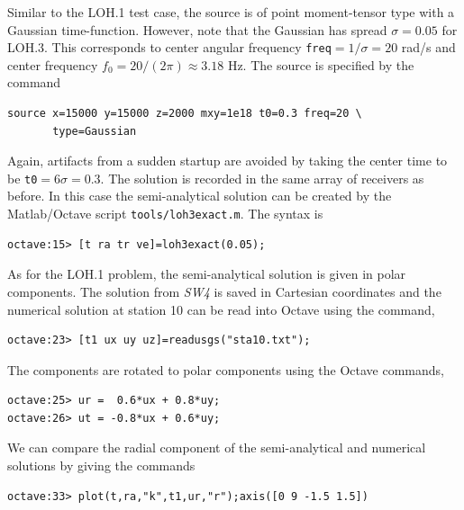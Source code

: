 \documentclass[11pt]{report}
\begin{document}
{Similar to the LOH.1 test case, the source is of point moment-tensor type with a Gaussian
time-function. However, note that the Gaussian has spread $\sigma=0.05$ for LOH.3. This corresponds
to center angular frequency {\tt freq}$= 1/\sigma=20$ rad/s and center frequency
$f_0=20/(2\pi)\approx 3.18$ Hz. The source is specified by the command
\begin{verbatim}
source x=15000 y=15000 z=2000 mxy=1e18 t0=0.3 freq=20 \
       type=Gaussian
\end{verbatim}
Again, artifacts from a sudden startup are avoided by taking the center time to be {\tt t0}$=6
	\sigma = 0.3$.  The solution is recorded in the same array of receivers as before.
In this case the semi-analytical solution can be created by the Matlab/Octave script
\verb+tools/loh3exact.m+. The syntax is
\begin{verbatim}
octave:15> [t ra tr ve]=loh3exact(0.05);
\end{verbatim}
As for the LOH.1 problem, the semi-analytical solution is given in polar components. The solution
from \emph{SW4} is saved in Cartesian coordinates and the numerical solution at station 10 can be
read into Octave using the command,
\begin{verbatim}
octave:23> [t1 ux uy uz]=readusgs("sta10.txt");
\end{verbatim}
The components are rotated to polar components using the Octave commands,
\begin{verbatim}
octave:25> ur =  0.6*ux + 0.8*uy;
octave:26> ut = -0.8*ux + 0.6*uy;
\end{verbatim}
We can compare the radial component of the semi-analytical and numerical solutions by giving the
commands
\begin{verbatim}
octave:33> plot(t,ra,"k",t1,ur,"r");axis([0 9 -1.5 1.5])
\end{verbatim}

}
\end{document}
